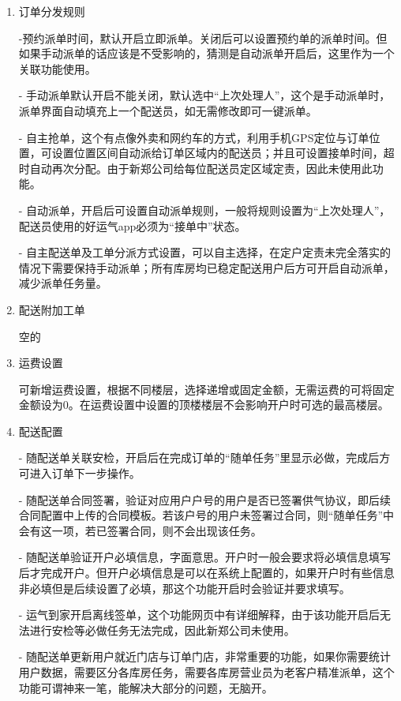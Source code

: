 \documentclass[UTF8]{ctexart}
\begin{document}
\begin{enumerate}
\item 订单分发规则

-预约派单时间，默认开启立即派单。关闭后可以设置预约单的派单时间。但如果手动派单的话应该是不受影响的，猜测是自动派单开启后，这里作为一个关联功能使用。

- 手动派单默认开启不能关闭，默认选中“上次处理人”，这个是手动派单时，派单界面自动填充上一个配送员，如无需修改即可一键派单。

- 自主抢单，这个有点像外卖和网约车的方式，利用手机GPS定位与订单位置，可设置位置区间自动派给订单区域内的配送员；并且可设置接单时间，超时自动再次分配。由于新郑公司给每位配送员定区域定责，因此未使用此功能。

- 自动派单，开启后可设置自动派单规则，一般将规则设置为“上次处理人”，配送员使用的好运气app必须为“接单中”状态。

- 自主配送单及工单分派方式设置，可以自主选择，在定户定责未完全落实的情况下需要保持手动派单；所有库房均已稳定配送用户后方可开启自动派单，减少派单任务量。

\item 配送附加工单

空的

\item 运费设置

可新增运费设置，根据不同楼层，选择递增或固定金额，无需运费的可将固定金额设为0。在运费设置中设置的顶楼楼层不会影响开户时可选的最高楼层。

\item 配送配置

- 随配送单关联安检，开启后在完成订单的“随单任务”里显示必做，完成后方可进入订单下一步操作。

- 随配送单合同签署，验证对应用户户号的用户是否已签署供气协议，即后续合同配置中上传的合同模板。若该户号的用户未签署过合同，则“随单任务”中会有这一项，若已签署合同，则不会出现该任务。

- 随配送单验证开户必填信息，字面意思。开户时一般会要求将必填信息填写后才完成开户。但开户必填信息是可以在系统上配置的，如果开户时有些信息非必填但是后续设置了必填，那这个功能开启时会验证并要求填写。

- 运气到家开启离线签单，这个功能网页中有详细解释，由于该功能开启后无法进行安检等必做任务无法完成，因此新郑公司未使用。

- 随配送单更新用户就近门店与订单门店，非常重要的功能，如果你需要统计用户数据，需要区分各库房任务，需要各库房营业员为老客户精准派单，这个功能可谓神来一笔，能解决大部分的问题，无脑开。

\end{enumerate}
\end{document}
